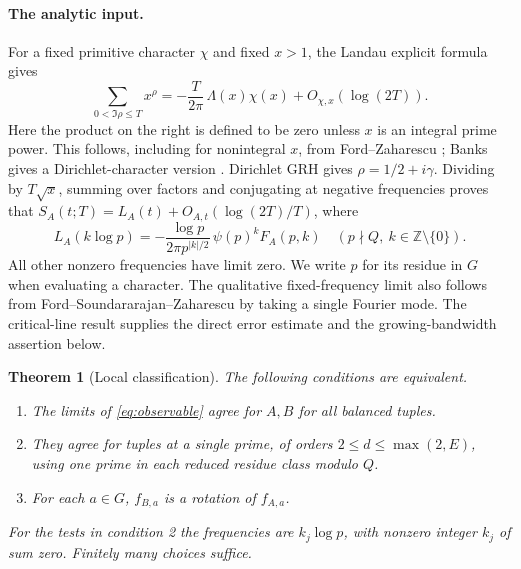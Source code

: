 \documentclass[11pt,letterpaper]{article}
\newtheorem{theorem}{Theorem}
\newcommand{\Z}{\mathbb Z}
\begin{document}
\paragraph{The analytic input.}
For a fixed primitive character $\chi$ and fixed $x>1$, the Landau explicit formula gives
\[
 \sum_{0<\Im\rho\le T}x^\rho
 =-\frac{T}{2\pi}\,\Lambda(x)\chi(x)+O_{\chi,x}(\log(2T)).
\]
Here the product on the right is defined to be zero unless $x$ is an integral prime power. This follows, including for nonintegral $x$, from Ford--Zaharescu \cite[Lemma 2.1]{FZ}; Banks gives a Dirichlet-character version \cite[Theorem 1.2]{Banks}. Dirichlet GRH gives $\rho=1/2+i\gamma$. Dividing by $T\sqrt{x}$, summing over factors and conjugating at negative frequencies proves that $S_A(t;T)=L_A(t)+O_{A,t}(\log(2T)/T)$, where
\begin{equation}
 L_A(k\log p)=-\frac{\log p}{2\pi p^{|k|/2}}\,\psi(p)^k F_A(p,k)
 \quad(p\nmid Q,\ k\in\Z\setminus\{0\}). \label{eq:landau}
\end{equation}
All other nonzero frequencies have limit zero. We write $p$ for its residue in $G$ when evaluating a character. The qualitative fixed-frequency limit also follows from Ford--Soundararajan--Zaharescu \cite[Theorem 5 and Corollary 1]{FSZ} by taking a single Fourier mode. The critical-line result supplies the direct error estimate and the growing-bandwidth assertion below.

\begin{theorem}[Local classification]\label{th:local}
The following conditions are equivalent.
\begin{enumerate}
\setlength\itemsep{0pt}
\item The limits of \eqref{eq:observable} agree for $A,B$ for all balanced tuples.
\item They agree for tuples at a single prime, of orders $2\le d\le\max(2,E)$, using one prime in each reduced residue class modulo $Q$.
\item For each $a\in G$, $f_{B,a}$ is a rotation of $f_{A,a}$.
\end{enumerate}
For the tests in condition 2 the frequencies are $k_j\log p$, with nonzero integer $k_j$ of sum zero. Finitely many choices suffice.
\end{theorem}

\newpage
\end{document}
